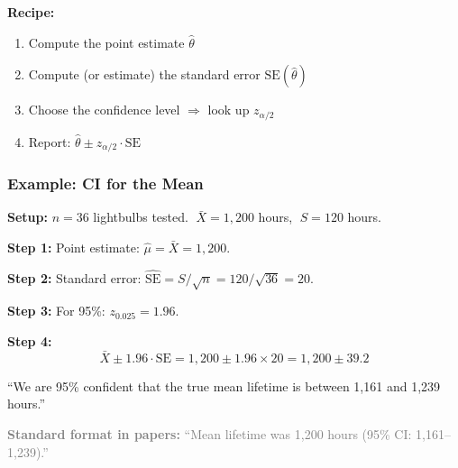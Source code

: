 \documentclass[aspectratio=169]{beamer}
\begin{document}
\begin{frame}
\vspace{-0.1cm}
\pause
\textbf{Recipe:}
\begin{enumerate}\setlength{\itemsep}{0pt}
  \item Compute the point estimate $\hat\theta$
  \item Compute (or estimate) the standard error $\text{SE}(\hat\theta)$
  \item Choose the confidence level $\Rightarrow$ look up $z_{\alpha/2}$
  \item Report: $\hat\theta \pm z_{\alpha/2} \cdot \text{SE}$
\end{enumerate}
\end{frame}

\begin{frame}
\frametitle{Example: CI for the Mean}

\small
\textbf{Setup:} $n = 36$ lightbulbs tested. $\;\bar{X} = 1{,}200$ hours, $\;S = 120$ hours.

\pause
\vspace{0.15cm}
\textbf{Step 1:} Point estimate: $\hat\mu = \bar{X} = 1{,}200$.

\pause
\textbf{Step 2:} Standard error: $\widehat{\text{SE}} = S / \sqrt{n} = 120/\sqrt{36} = 20$.

\pause
\textbf{Step 3:} For 95\%: $z_{0.025} = 1.96$.

\pause
\textbf{Step 4:}
$$\bar{X} \pm 1.96 \cdot \text{SE} = 1{,}200 \pm 1.96 \times 20 = 1{,}200 \pm 39.2$$

\vspace{0.1cm}
\begin{center}
\end{center}

\vspace{0.1cm}
\centering\small
``We are 95\% confident that the true mean lifetime is between 1{,}161 and 1{,}239 hours.''

\vspace{0.05cm}
{\footnotesize\textcolor{gray}{\textbf{Standard format in papers:} ``Mean lifetime was 1{,}200 hours (95\% CI: 1{,}161--1{,}239).''}}
\end{frame}
\end{document}
